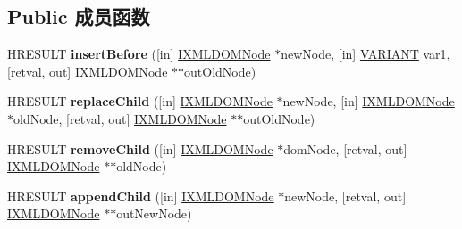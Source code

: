 \subsection*{Public 成员函数}
\begin{DoxyCompactItemize}
\item 
\mbox{\label{interface_m_s_x_m_l2_1_1_i_x_m_l_d_o_m_node_ad35d49fbb38d2dfb4556d9a6e1095710}} 
H\+R\+E\+S\+U\+LT {\bfseries insert\+Before} (\mbox{[}in\mbox{]} \hyperlink{interface_m_s_x_m_l2_1_1_i_x_m_l_d_o_m_node}{I\+X\+M\+L\+D\+O\+M\+Node} $\ast$new\+Node, \mbox{[}in\mbox{]} \hyperlink{structtag_v_a_r_i_a_n_t}{V\+A\+R\+I\+A\+NT} var1, \mbox{[}retval, out\mbox{]} \hyperlink{interface_m_s_x_m_l2_1_1_i_x_m_l_d_o_m_node}{I\+X\+M\+L\+D\+O\+M\+Node} $\ast$$\ast$out\+Old\+Node)
\item 
\mbox{\label{interface_m_s_x_m_l2_1_1_i_x_m_l_d_o_m_node_a715d3cb402b739eaa1e25201446478f2}} 
H\+R\+E\+S\+U\+LT {\bfseries replace\+Child} (\mbox{[}in\mbox{]} \hyperlink{interface_m_s_x_m_l2_1_1_i_x_m_l_d_o_m_node}{I\+X\+M\+L\+D\+O\+M\+Node} $\ast$new\+Node, \mbox{[}in\mbox{]} \hyperlink{interface_m_s_x_m_l2_1_1_i_x_m_l_d_o_m_node}{I\+X\+M\+L\+D\+O\+M\+Node} $\ast$old\+Node, \mbox{[}retval, out\mbox{]} \hyperlink{interface_m_s_x_m_l2_1_1_i_x_m_l_d_o_m_node}{I\+X\+M\+L\+D\+O\+M\+Node} $\ast$$\ast$out\+Old\+Node)
\item 
\mbox{\label{interface_m_s_x_m_l2_1_1_i_x_m_l_d_o_m_node_a8b28657d4335a04a0080bf1ce46c605d}} 
H\+R\+E\+S\+U\+LT {\bfseries remove\+Child} (\mbox{[}in\mbox{]} \hyperlink{interface_m_s_x_m_l2_1_1_i_x_m_l_d_o_m_node}{I\+X\+M\+L\+D\+O\+M\+Node} $\ast$dom\+Node, \mbox{[}retval, out\mbox{]} \hyperlink{interface_m_s_x_m_l2_1_1_i_x_m_l_d_o_m_node}{I\+X\+M\+L\+D\+O\+M\+Node} $\ast$$\ast$old\+Node)
\item 
\mbox{\label{interface_m_s_x_m_l2_1_1_i_x_m_l_d_o_m_node_a617de4726ae86891435139a2788c4865}} 
H\+R\+E\+S\+U\+LT {\bfseries append\+Child} (\mbox{[}in\mbox{]} \hyperlink{interface_m_s_x_m_l2_1_1_i_x_m_l_d_o_m_node}{I\+X\+M\+L\+D\+O\+M\+Node} $\ast$new\+Node, \mbox{[}retval, out\mbox{]} \hyperlink{interface_m_s_x_m_l2_1_1_i_x_m_l_d_o_m_node}{I\+X\+M\+L\+D\+O\+M\+Node} $\ast$$\ast$out\+New\+Node)
\item 

\end{DoxyCompactItemize}
